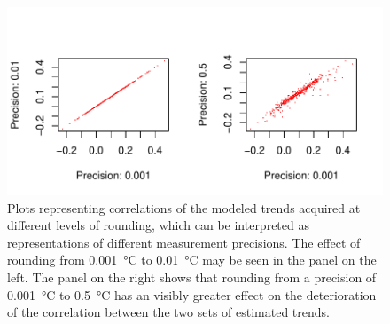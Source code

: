 \documentclass[]{ametsoc}
\begin{document}
\begin{figure}
\centering \includegraphics[width=1.0\textwidth]{figure08}
\caption{Plots representing correlations of the modeled trends acquired at different levels of rounding, which can be interpreted as representations of different measurement precisions. The effect of rounding from \SI{0.001}{\degreeCelsius} to \SI{0.01}{\degreeCelsius} may be seen in the panel on the left. The panel on the right shows that rounding from a precision of \SI{0.001}{\degreeCelsius} to \SI{0.5}{\degreeCelsius} has an visibly greater effect on the deterioration of the correlation between the two sets of estimated trends.}
\label{figure08}
\end{figure}
\end{document}
